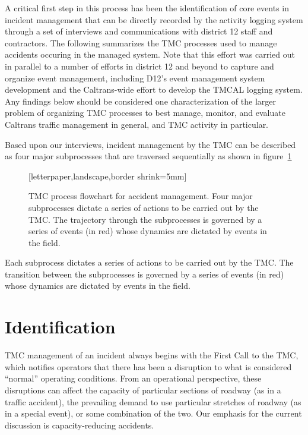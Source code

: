 \documentclass[12pt]{report}
\begin{document}
A critical first step in this process has been the identification of core events
in incident management that can be directly recorded by the activity logging
system through a set of interviews and communications with district 12 staff and
contractors.  The following summarizes the TMC processes used to manage
accidents occuring in the managed system.  Note that this effort was carried out
in parallel to a number of efforts in district 12 and beyond to capture and
organize event management, including D12's event management system development
and the Caltrans-wide effort to develop the TMCAL logging system.  Any findings
below should be considered one characterization of the larger problem of
organizing TMC processes to best manage, monitor, and evaluate Caltrans traffic
management in general, and TMC activity in particular.

Based upon our interviews, incident management by the TMC can be described as
four major subprocesses that are traversed sequentially as shown in
figure~\ref{fig:flowchart}
\begin{figure}
  [letterpaper,landscape,border shrink=5mm]
  \centering
  
  \caption[TMC process flowchart for accident management]{TMC process
    flowchart for accident management.  Four major subprocesses
    dictate a series of actions to be carried out by the TMC.  The
    trajectory through the subprocesses is governed by a series of
    events (in red) whose dynamics are dictated by events in the
    field.}
  \label{fig:flowchart}
\end{figure}
Each subprocess dictates a series of actions to be carried out by the TMC.  The
transition between the subprocesses is governed by a series of events (in red)
whose dynamics are dictated by events in the field.

\section{Identification}
\label{sec:identification}


TMC management of an incident always begins with the {\sc First Call} to the
TMC, which notifies operators that there has been a disruption to what is
considered ``normal'' operating conditions.  From an operational perspective,
these disruptions can affect the capacity of particular sections of roadway (as
in a traffic accident), the prevailing demand to use particular stretches of
roadway (as in a special event), or some combination of the two.  Our emphasis
for the current discussion is capacity-reducing accidents.
\end{document}
